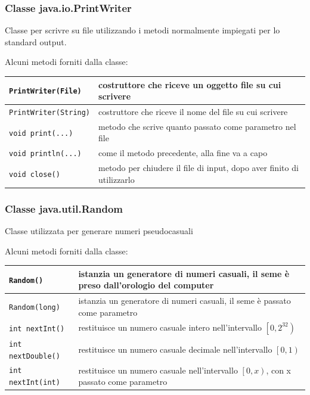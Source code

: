 \documentclass{article}
\begin{document}
\newpage


\subsubsection*{Classe java.io.PrintWriter}
Classe per scrivre su file utilizzando i metodi normalmente impiegati per lo standard output.

Alcuni metodi forniti dalla classe:
\begin{center}
	\begin{tabularx}{\textwidth}{l X}
		\toprule
		\verb|PrintWriter(File)| & costruttore che riceve un oggetto file su cui scrivere \\
		\midrule
		\verb|PrintWriter(String)| & costruttore che riceve il nome del file su cui scrivere \\
		\midrule
		\verb|void print(...)| & metodo che scrive quanto passato come parametro nel file \\
		\midrule
		\verb|void println(...)| & come il metodo precedente, alla fine va a capo \\
		\midrule
		\verb|void close()| & metodo per chiudere il file di input, dopo aver finito di utilizzarlo \\
		\bottomrule
	\end{tabularx}
\end{center}

\subsubsection*{Classe java.util.Random}
Classe utilizzata per generare numeri pseudocasuali

Alcuni metodi forniti dalla classe:
\begin{center}
	\begin{tabularx}{\textwidth}{l X}
		\toprule
		\verb|Random()| & istanzia un generatore di numeri casuali, il seme è preso dall'orologio del computer \\
		\midrule
		\verb|Random(long)| & istanzia un generatore di numeri casuali, il seme è passato come parametro \\
		\midrule
		\verb|int nextInt()| & restituisce un numero casuale intero nell'intervallo \(\left[0, 2^{32}\right)\) \\
		\midrule
		\verb|int nextDouble()| & restituisce un numero casuale decimale nell'intervallo \(\left[0, 1\right)\)\\
		\midrule
		\verb|int nextInt(int)| & restituisce un numero casuale nell'intervallo \(\left[0, x\right)\), con x passato come parametro \\
		\bottomrule
	\end{tabularx}
\end{center}
\end{document}
